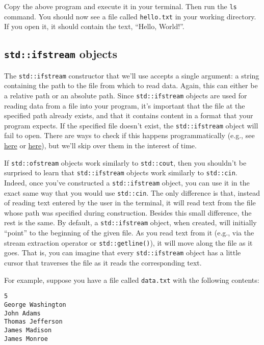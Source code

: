 \documentclass{article}
\begin{document}
Copy the above program and execute it in your terminal. Then run the \texttt{ls} command. You should now see a file called \texttt{hello.txt} in your working directory. If you open it, it should contain the text, ``Hello, World!''.

\subsection{\texttt{std::ifstream} objects}

The \texttt{std::ifstream} constructor that we'll use accepts a single argument: a string containing the path to the file from which to read data. Again, this can either be a relative path or an absolute path. Since \texttt{std::ifstream} objects are used for reading data from a file into your program, it's important that the file at the specified path already exists, and that it contains content in a format that your program expects. If the specified file doesn't exist, the \texttt{std::ifstream} object will fail to open. There are ways to check if this happens programmatically (e.g., see \href{https://cplusplus.com/reference/fstream/ifstream/is_open/}{here} or \href{https://cplusplus.com/reference/ios/ios/fail/}{here}), but we'll skip over them in the interest of time.

If \texttt{std::ofstream} objects work similarly to \texttt{std::cout}, then you shouldn't be surprised to learn that \texttt{std::ifstream} objects work similarly to \texttt{std::cin}. Indeed, once you've constructed a \texttt{std::ifstream} object, you can use it in the exact same way that you would use \texttt{std::cin}. The only difference is that, instead of reading text entered by the user in the terminal, it will read text from the file whose path was specified during construction. Besides this small difference, the rest is the same. By default, a \texttt{std::ifstream} object, when created, will initially ``point'' to the beginning of the given file. As you read text from it (e.g., via the stream extraction operator or \texttt{std::getline()}), it will move along the file as it goes. That is, you can imagine that every \texttt{std::ifstream} object has a little cursor that traverses the file as it reads the corresponding text.

For example, suppose you have a file called \texttt{data.txt} with the following contents:

\begin{verbatim}
5
George Washington
John Adams
Thomas Jefferson
James Madison
James Monroe
\end{verbatim}
\end{document}
